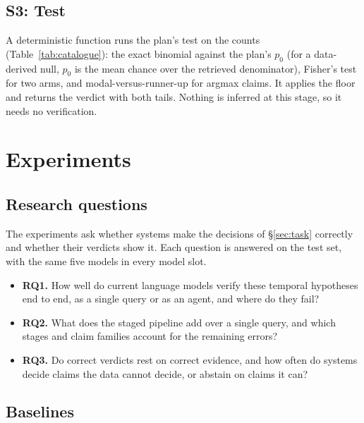 \subsection{S3: Test}

A deterministic function runs the plan's test on the counts
(Table~\ref{tab:catalogue}): the exact binomial against the plan's $p_0$ (for
a data-derived null, $p_0$ is the mean chance over the retrieved
denominator), Fisher's test for two arms, and modal-versus-runner-up for
argmax claims. It applies the floor and returns the verdict with both tails.
Nothing is inferred at this stage, so it needs no verification.

\section{Experiments}
\label{sec:experiments}

\subsection{Research questions}
\label{sec:rqs}

The experiments ask whether systems make the decisions of
\S\ref{sec:task} correctly and whether their verdicts show it. Each
question is answered on the test set, with the same five models in every
model slot.

\begin{itemize}
\item \textbf{RQ1.} How well do current language models verify these
temporal hypotheses end to end, as a single query or as an agent, and where
do they fail?
\item \textbf{RQ2.} What does the staged pipeline add over a single query,
and which stages and claim families account for the remaining errors?
\item \textbf{RQ3.} Do correct verdicts rest on correct evidence, and how
often do systems decide claims the data cannot decide, or abstain on claims
it can?
\end{itemize}

\subsection{Baselines}
\label{sec:baselines}

